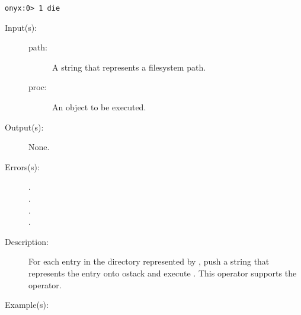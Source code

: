 \begin{description}
\begin{description}
\begin{verbatim}
onyx:0> 1 die
		\end{verbatim}
	\end{description}
\label{systemdict:dirforeach}
\item[{\onyxop{path proc}{dirforeach}{--}}: ]
	\begin{description}\item[]
	\item[Input(s): ]
		\begin{description}\item[]
		\item[path: ]
			A string that represents a filesystem path.
		\item[proc: ]
			An object to be executed.
		\end{description}
	\item[Output(s): ] None.
	\item[Errors(s): ]
		\begin{description}\item[]
		\item[.]
		\item[.]
		\item[.]
		\item[.]
		\end{description}
	\item[Description: ]
		For each entry in the directory represented by ,
		push a string that represents the entry onto ostack and
		execute .  This operator supports the
		 operator.
	\item[Example(s): ]\begin{verbatim}


\end{verbatim}
\end{description}
\end{description}

